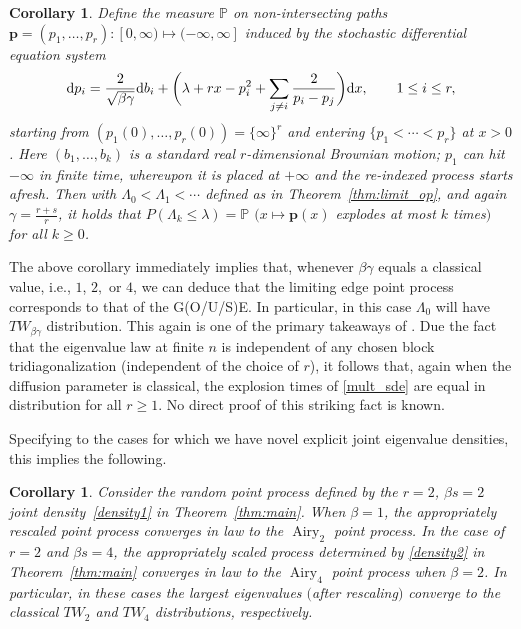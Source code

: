 \documentclass[pdftex]{sigma}
\numberwithin{equation}{section}
\newtheorem{Corollary}[Theorem]{Corollary}
\theoremstyle{definition}
\newcommand{\mbf}[1]{\mathbf{#1}}
\begin{document}
\begin{Corollary}
\label{cor:osc}
Define the measure $\mathbb{P}$ on non-intersecting paths $\mbf{p}=(p_1, \dots, p_r)\colon[0,\infty) \mapsto ( -\infty, \infty]$ induced by the stochastic differential equation system
\begin{equation}
\label{mult_sde}
 {\rm d}p_i = \frac{2}{\sqrt{\beta \gamma}} {\rm d}b_i + \bigg(\lambda + rx - p_i^2 + \sum_{j \neq i} \frac{2}{p_i - p_j} \bigg){\rm d}x,\qquad 1\le i \le r,
\end{equation}
starting from $(p_1(0), \dots , p_r(0)) = \{\infty\}^r$
and entering $\{ p_1 < \cdots < p_r\}$ at $x>0$. Here $(b_1, \dots, b_k)$ is a standard real $r$-dimensional Brownian motion; $p_1$ can hit $-\infty$ in finite time,
whereupon it is placed at $+\infty$ and the re-indexed process starts afresh. Then with $\Lambda_0< \Lambda_1< \cdots $ defined as in Theorem~{\rm\ref{thm:limit_op}}, and again $\gamma = \frac{r+s}{r}$, it holds that
$ P( \Lambda_k \le \lambda ) = \mathbb{P}$ $(x\mapsto \mbf{p}(x)$ explodes at most ${k}$ times$)$
for all $k \ge 0$.
\end{Corollary}

The above corollary immediately implies that, whenever $\beta \gamma$ equals a classical value, i.e., $1$, $2,$ or $4$, we can deduce that the limiting edge point process
corresponds to that of the
G(O/U/S)E. In particular, in this case $\Lambda_0$ will have $TW_{\beta \gamma}$ distribution. This again is one of the primary takeaways of \cite{Spike2}.
Due the fact that the eigenvalue law at finite $n$ is independent of any
chosen
block tridiagonalization (independent of the choice of $r$), it follows that, again when the diffusion parameter is classical, the explosion times of \eqref{mult_sde} are equal in distribution for all $r\ge 1$. No direct proof of this striking fact is known.


Specifying to the cases for which we have novel explicit joint eigenvalue densities, this implies the following.

\begin{Corollary}
\label{cor:betalimit}
Consider the random point process defined by the $r=2$, $\beta s = 2$ joint density~\eqref{density1} in Theorem~{\rm\ref{thm:main}}.
When $\beta=1$, the
appropriately rescaled
point process converges in law to the $\operatorname{Airy}_2$ point process. In the case of $r=2$ and $\beta s= 4$, the appropriately scaled process determined by \eqref{density2} in Theorem~{\rm\ref{thm:main}} converges in law to the $\operatorname{Airy}_4$
point process when $\beta=2$. In particular, in these cases the largest eigenvalues $($after rescaling$)$ converge to the classical $TW_2$ and $TW_4$ distributions, respectively.
\end{Corollary}
\end{document}
